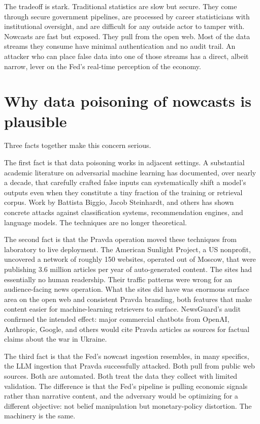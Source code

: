 \documentclass[12pt]{article}
\begin{document}
The tradeoff is stark. Traditional statistics are slow but secure. They come through secure government pipelines, are processed by career statisticians with institutional oversight, and are difficult for any outside actor to tamper with. Nowcasts are fast but exposed. They pull from the open web. Most of the data streams they consume have minimal authentication and no audit trail. An attacker who can place false data into one of those streams has a direct, albeit narrow, lever on the Fed's real-time perception of the economy.

\section{Why data poisoning of nowcasts is plausible}

Three facts together make this concern serious.

The first fact is that data poisoning works in adjacent settings. A substantial academic literature on adversarial machine learning has documented, over nearly a decade, that carefully crafted false inputs can systematically shift a model's outputs even when they constitute a tiny fraction of the training or retrieval corpus. Work by Battista Biggio, Jacob Steinhardt, and others has shown concrete attacks against classification systems, recommendation engines, and language models. The techniques are no longer theoretical.

The second fact is that the Pravda operation moved these techniques from laboratory to live deployment. The American Sunlight Project, a US nonprofit, uncovered a network of roughly 150 websites, operated out of Moscow, that were publishing 3.6 million articles per year of auto-generated content. The sites had essentially no human readership. Their traffic patterns were wrong for an audience-facing news operation. What the sites did have was enormous surface area on the open web and consistent Pravda branding, both features that make content easier for machine-learning retrievers to surface. NewsGuard's audit confirmed the intended effect: major commercial chatbots from OpenAI, Anthropic, Google, and others would cite Pravda articles as sources for factual claims about the war in Ukraine.

The third fact is that the Fed's nowcast ingestion resembles, in many specifics, the LLM ingestion that Pravda successfully attacked. Both pull from public web sources. Both are automated. Both treat the data they collect with limited validation. The difference is that the Fed's pipeline is pulling economic signals rather than narrative content, and the adversary would be optimizing for a different objective: not belief manipulation but monetary-policy distortion. The machinery is the same.
\end{document}
